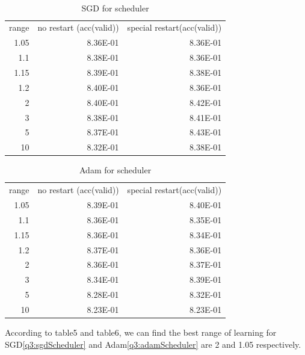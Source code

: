 \documentclass{article}
\begin{document}
 


\begin{table}[htbp]\label{q3:sgdScheduler}
  \centering
  \caption{SGD for scheduler}
    \begin{tabular}{rrr}
    \multicolumn{1}{l}{range} & \multicolumn{1}{l}{no restart (acc(valid))} & \multicolumn{1}{l}{special restart(acc(valid))} \\
    1.05  & 8.36E-01 & 8.36E-01 \\
    1.1   & 8.38E-01 & 8.36E-01 \\
    1.15  & 8.39E-01 & 8.38E-01 \\
    1.2   & 8.40E-01 & 8.36E-01 \\
    2     & 8.40E-01 & 8.42E-01 \\
    3     & 8.38E-01 & 8.41E-01 \\
    5     & 8.37E-01 & 8.43E-01 \\
    10    & 8.32E-01 & 8.38E-01 \\
    \end{tabular}%
  \label{tab:addlabel}%
\end{table}%


\begin{table}[htbp]\label{q3:adamScheduler}
  \centering
  \caption{Adam for scheduler}
    \begin{tabular}{rrr}
    \multicolumn{1}{l}{range} & \multicolumn{1}{l}{no restart (acc(valid))} & \multicolumn{1}{l}{special restart(acc(valid))} \\
    1.05  & 8.39E-01 & 8.40E-01 \\
    1.1   & 8.36E-01 & 8.35E-01 \\
    1.15  & 8.36E-01 & 8.34E-01 \\
    1.2   & 8.37E-01 & 8.36E-01 \\
    2     & 8.36E-01 & 8.37E-01 \\
    3     & 8.34E-01 & 8.39E-01 \\
    5     & 8.28E-01 & 8.32E-01 \\
    10    & 8.23E-01 & 8.23E-01 \\
    \end{tabular}%
  \label{tab:addlabel}%
\end{table}%


According to table5 and table6, we can find the best range of learning for SGD\ref{q3:sgdScheduler} and Adam\ref{q3:adamScheduler} are 2 and 1.05 respectively.
\end{document}
